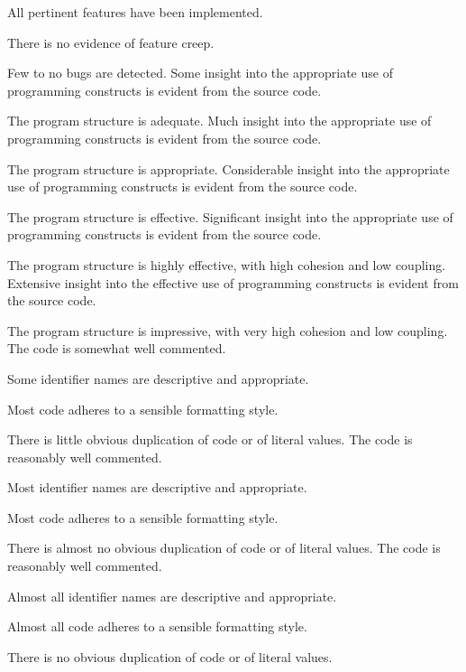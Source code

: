 \documentclass{../fal_assignment}
\begin{document}
\begin{markingrubric}
        \grade All pertinent features have been implemented.
            \par There is no evidence of feature creep.
            \par Few to no bugs are detected.
%
        \grade \fail 
        \grade Some insight into the appropriate use of programming constructs is evident from the source code.
            \par The program structure is adequate.
        \grade Much insight into the appropriate use of programming constructs is evident from the source code.
            \par The program structure is appropriate.
        \grade Considerable insight into the appropriate use of programming constructs is evident from the source code.
            \par The program structure is effective.
        \grade Significant insight into the appropriate use of programming constructs is evident from the source code.
            \par The program structure is highly effective, with high cohesion and low coupling.
        \grade Extensive insight into the effective use of programming constructs is evident from the source code.
            \par The program structure is impressive, with very high cohesion and low coupling.
%
        \grade \fail 
        \grade The code is somewhat well commented.
            \par Some identifier names are descriptive and appropriate.
            \par Most code adheres to a sensible formatting style.
             \par There is little obvious duplication of code or of literal values.           
        \grade The code is reasonably well commented.
            \par Most identifier names are descriptive and appropriate.
            \par Most code adheres to a sensible formatting style.
             \par There is almost no obvious duplication of code or of literal values.   
        \grade The code is reasonably well commented.
            \par Almost all identifier names are descriptive and appropriate.
            \par Almost all code adheres to a sensible formatting style.
             \par There is no obvious duplication of code or of literal values.

\end{markingrubric}
\end{document}
